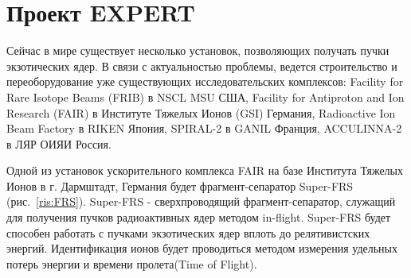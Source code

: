 \section{Проект EXPERT}
Сейчас в мире существует несколько установок, позволяющих получать пучки экзотических ядер. В связи с актуальностью проблемы, ведется строительство и переоборудование уже существующих исследовательских комплексов: Facility for Rare Isotope Beams (FRIB) в NSCL MSU США, Facility for Antiproton and Ion Research (FAIR) в Институте Тяжелых Ионов (GSI) Германия, Radioactive Ion Beam Factory в RIKEN Япония, SPIRAL-2 в GANIL Франция, ACCULINNA-2 в ЛЯР ОИЯИ Россия. 
 



Одной из установок ускорительного комплекса FAIR на базе Института Тяжелых Ионов в г. Дармштадт, Германия будет фрагмент-сепаратор Super-FRS (рис.~\ref{ris:FRS}). Super-FRS - сверхпроводящий фрагмент-сепаратор, служащий для получения пучков радиоактивных ядер методом in-flight. Super-FRS будет способен работать с пучками экзотических ядер вплоть до релятивистских энергий. Идентификация ионов будет проводиться методом измерения удельных потерь энергии  и времени пролета(Time of Flight). 

